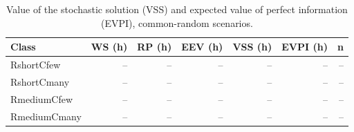 \begin{table}[ht]\centering
\caption{Value of the stochastic solution (VSS) and expected value of perfect information (EVPI), common-random scenarios.}
\label{tab:vss}
\begin{tabular}{lrrrrrr}
\hline
Class & WS (h) & RP (h) & EEV (h) & VSS (h) & EVPI (h) & n \\
\hline
RshortCfew & -- & -- & -- & -- & -- & -- \\
RshortCmany & -- & -- & -- & -- & -- & -- \\
RmediumCfew & -- & -- & -- & -- & -- & -- \\
RmediumCmany & -- & -- & -- & -- & -- & -- \\
\hline
\end{tabular}
\end{table}
